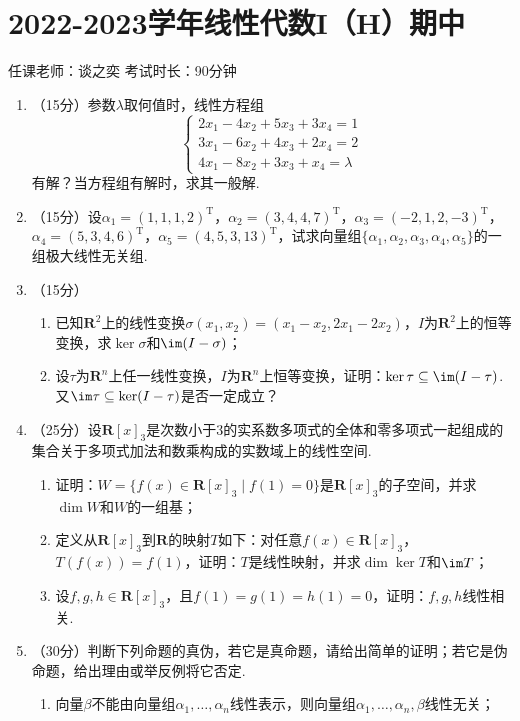 \section{2022-2023学年线性代数I（H）期中}

\begin{center}
    任课老师：谈之奕\hspace{4em} 考试时长：90分钟
\end{center}
\begin{enumerate}
    \item （15分）参数$\lambda$取何值时，线性方程组
	\[\begin{cases}
        2x_1-4x_2+5x_3+3x_4=1 \\
        3x_1-6x_2+4x_3+2x_4=2 \\
        4x_1-8x_2+3x_3+x_4=\lambda
    \end{cases}\]
    有解？当方程组有解时，求其一般解.
	\item （15分）设$\alpha_1=(1,1,1,2)^\mathrm{T}$，$\alpha_2=(3,4,4,7)^\mathrm{T}$，$\alpha_3=(-2,1,2,-3)^\mathrm{T}$，$\alpha_4=(5,3,4,6)^\mathrm{T}$，$\alpha_5=(4,5,3,13)^\mathrm{T}$，试求向量组$\{\alpha_1,\alpha_2,\alpha_3,\alpha_4,\alpha_5\}$的一组极大线性无关组.
	\item （15分）
    \begin{enumerate}
        \item 已知$\mathbf{R}^2$上的线性变换$\sigma(x_1,x_2)=(x_1-x_2,2x_1-2x_2)$，$I$为$\mathbf{R}^2$上的恒等变换，求$\ker\sigma$和$\im(I-\sigma)$；

        \item 设$\tau$为$\mathbf{R}^n$上任一线性变换，$I$为$\mathbf{R}^n$上恒等变换，证明：$\ker\tau\subseteq\im(I-\tau)$. 又$\im\tau\subseteq\ker(I-\tau)$是否一定成立？
    \end{enumerate}
	\item （25分）设$\mathbf{R}[x]_3$是次数小于3的实系数多项式的全体和零多项式一起组成的集合关于多项式加法和数乘构成的实数域上的线性空间.
	\begin{enumerate}
        \item 证明：$W=\{f(x)\in\mathbf{R}[x]_3\mid f(1)=0\}$是$\mathbf{R}[x]_3$的子空间，并求$\dim W$和$W$的一组基；

        \item 定义从$\mathbf{R}[x]_3$到$\mathbf{R}$的映射$T$如下：对任意$f(x)\in\mathbf{R}[x]_3$，$T(f(x))=f(1)$，证明：$T$是线性映射，并求$\dim\ker T$和$\im T$；

        \item 设$f,g,h\in\mathbf{R}[x]_3$，且$f(1)=g(1)=h(1)=0$，证明：$f,g,h$线性相关.
    \end{enumerate}
	\item （30分）判断下列命题的真伪，若它是真命题，请给出简单的证明；若它是伪命题，给出理由或举反例将它否定.
    \begin{enumerate}
        \item 向量$\beta$不能由向量组$\alpha_1,\ldots,\alpha_n$线性表示，则向量组$\alpha_1,\ldots,\alpha_n,\beta$线性无关；


\end{enumerate}
\end{enumerate}
